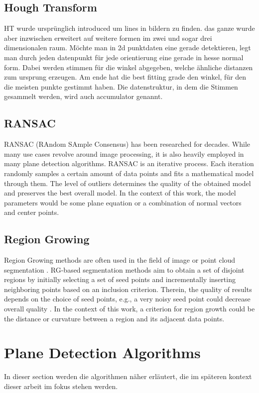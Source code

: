 \documentclass[main.tex]{subfiles}
\begin{document}
\subsection*{Hough Transform}
HT wurde ursprünglich introduced um lines in bildern zu finden. das ganze wurde aber inzwischen erweitert auf weitere 
formen im zwei und sogar drei dimensionalen raum.
Möchte man in 2d punktdaten eine gerade detektieren, legt man durch jeden datenpunkt für jede orientierung eine gerade in hesse normal form. Dabei werden stimmen für 
die winkel abgegeben, welche ähnliche distanzen zum ursprung erzeugen. Am ende hat die best fitting grade den winkel, für den die meisten punkte gestimmt haben.
Die datenstruktur, in dem die Stimmen gesammelt werden, wird auch accumulator genannt.


\subsection*{RANSAC}
RANSAC (RAndom SAmple Consensus) has been researched for decades. While many use cases revolve around image processing, it is also heavily employed in many plane detection algorithms\cite{Sun_Mordohai_2019,Yang_Forstner,Ashraf_Ahmed_2017}.
RANSAC is an iterative process. Each iteration randomly samples a certain amount of data points and fits a mathematical model through them. The level of outliers determines the quality of the obtained model and preserves the best overall model.
In the context of this work, the model parameters would be some plane equation or a combination of normal vectors and center points.

\subsection*{Region Growing}
Region Growing methods are often used in the field of image or point cloud segmentation \cite{Proença_Gao_2018, Vo_Truong-Hong_Laefer_Bertolotto_2015}. 
RG-based segmentation methods aim to obtain a set of disjoint regions by initially selecting a set of seed points and incrementally inserting neighboring points based on an inclusion criterion. 
Therein, the quality of results depends on the choice of seed points, e.g., a very noisy seed point could decrease overall quality  \cite{Malek_Rahman_Yasiran_Jumaat_Jalil_2012}.   
In the context of this work, a criterion for region growth could be the distance or curvature between a region and its adjacent data points. 

\section{Plane Detection Algorithms}
In dieser section werden die algorithmen näher erläutert, die im späteren kontext dieser arbeit im fokus stehen werden.
\end{document}
